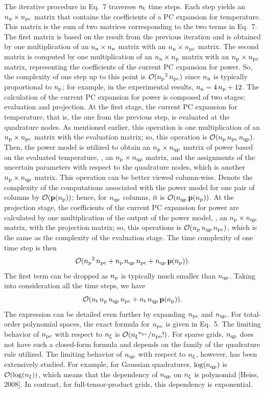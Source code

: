\begin{authors}
The iterative procedure in Eq.~7 traverses ${n_\text{t}}$ time steps.
Each step yields an ${n_\text{n}} \times {n_\text{pc}}$ matrix that contains the coefficients of a PC expansion for temperature.
This matrix is the sum of two matrices corresponding to the two terms in Eq.~7.
The first matrix is based on the result from the previous iteration and is obtained by one multiplication of an ${n_\text{n}} \times {n_\text{n}}$ matrix with an ${n_\text{n}} \times {n_\text{pc}}$ matrix.
The second matrix is computed by one multiplication of an ${n_\text{n}} \times {n_\text{p}}$ matrix with an ${n_\text{p}} \times {n_\text{pc}}$ matrix, representing the coefficients of the current PC expansion for power.
So, the complexity of one step up to this point is $\mathcal{O}({n_\text{p}}^2 \, {n_\text{pc}})$ since ${n_\text{n}}$ is typically proportional to ${n_\text{p}}$; for example, in the experimental results, ${n_\text{n}} = 4 \, {n_\text{p}} + 12$.
The calculation of the current PC expansion for power is composed of two stages: evaluation and projection.
At the first stage, the current PC expansion for temperature, that is, the one from the previous step, is evaluated at the quadrature nodes.
As mentioned earlier, this operation is one multiplication of an ${n_\text{p}} \times {n_\text{pc}}$ matrix with the evaluation matrix; so, this operation is $\mathcal{O}({n_\text{p}} \, {n_\text{pc}} \, {n_\text{qp}})$.
Then, the power model is utilized to obtain an ${n_\text{p}} \times {n_\text{qp}}$ matrix of power based on the evaluated temperature, \ie, an ${n_\text{p}} \times {n_\text{qp}}$ matrix, and the assignments of the uncertain parameters with respect to the quadrature nodes, which is another ${n_\text{p}} \times {n_\text{qp}}$ matrix.
This operation can be better viewed column-wise.
Denote the complexity of the computations associated with the power model for one pair of columns by $\mathcal{O}(\mathbf{p}({n_\text{p}}))$; hence, for ${n_\text{qp}}$ columns, it is $\mathcal{O}({n_\text{qp}} \, \mathbf{p}({n_\text{p}}))$.
At the projection stage, the coefficients of the current PC expansion for power are calculated by one multiplication of the output of the power model, \ie, an ${n_\text{p}} \times {n_\text{qp}}$ matrix, with the projection matrix; so, this operations is $\mathcal{O}({n_\text{p}} \, {n_\text{qp}} \, {n_\text{pc}})$, which is the same as the complexity of the evaluation stage.
The time complexity of one time step is then
\[
  \mathcal{O}({n_\text{p}}^2 \, {n_\text{pc}} + {n_\text{p}} \, {n_\text{qp}} \, {n_\text{pc}} + {n_\text{qp}} \, \mathbf{p}({n_\text{p}})).
\]
The first term can be dropped as ${n_\text{p}}$ is typically much smaller than ${n_\text{qp}}$.
Taking into consideration all the time steps, we have
\[
  \mathcal{O}({n_\text{t}} \, {n_\text{p}} \, {n_\text{qp}} \, {n_\text{pc}} + {n_\text{t}} \, {n_\text{qp}} \, \mathbf{p}({n_\text{p}})).
\]
The expression can be detailed even further by expanding ${n_\text{pc}}$ and ${n_\text{qp}}$.
For total-order polynomial spaces, the exact formula for ${n_\text{pc}}$ is given in Eq.~5.
The limiting behavior of ${n_\text{pc}}$ with respect to ${n_\xi}$ is $\mathcal{O}({n_\xi}^{n_\text{po}} / {n_\text{po}}!)$.
For sparse grids, ${n_\text{qp}}$ does not have such a closed-form formula and depends on the family of the quadrature rule utilized.
The limiting behavior of ${n_\text{qp}}$ with respect to ${n_\xi}$, however, has been extensively studied.
For example, for Gaussian quadratures, $\log({n_\text{qp}})$ is $\mathcal{O}(\log({n_\xi}))$, which means that the dependency of ${n_\text{qp}}$ on ${n_\xi}$ is polynomial [Heiss, 2008].
In contrast, for full-tensor-product grids, this dependency is exponential.


\end{authors}
